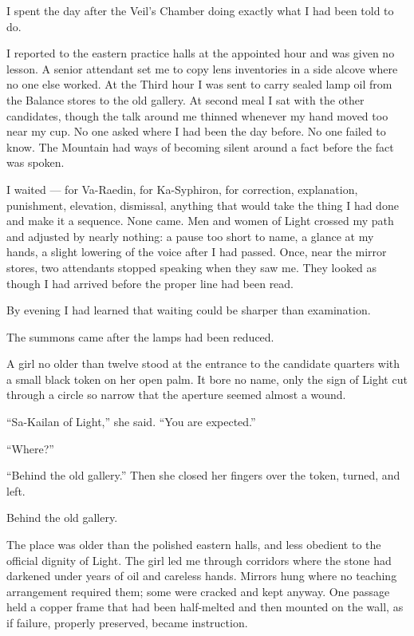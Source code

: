 \ornament

I spent the day after the Veil's Chamber doing exactly what I had been told to do.\par

I reported to the eastern practice halls at the appointed hour and was given no lesson. A senior attendant set me to copy lens inventories in a side alcove where no one else worked. At the Third hour I was sent to carry sealed lamp oil from the Balance stores to the old gallery. At second meal I sat with the other candidates, though the talk around me thinned whenever my hand moved too near my cup. No one asked where I had been the day before. No one failed to know. The Mountain had ways of becoming silent around a fact before the fact was spoken.\par

I waited --- for Va-Raedin, for Ka-Syphiron, for correction, explanation, punishment, elevation, dismissal, anything that would take the thing I had done and make it a sequence. None came. Men and women of Light crossed my path and adjusted by nearly nothing: a pause too short to name, a glance at my hands, a slight lowering of the voice after I had passed. Once, near the mirror stores, two attendants stopped speaking when they saw me. They looked as though I had arrived before the proper line had been read.\par

By evening I had learned that waiting could be sharper than examination.\par

The summons came after the lamps had been reduced.\par

A girl no older than twelve stood at the entrance to the candidate quarters with a small black token on her open palm. It bore no name, only the sign of Light cut through a circle so narrow that the aperture seemed almost a wound.\par

``Sa-Kailan of Light,'' she said. ``You are expected.''\par

``Where?''\par

``Behind the old gallery.'' Then she closed her fingers over the token, turned, and left.\par

Behind the old gallery.\par

The place was older than the polished eastern halls, and less obedient to the official dignity of Light. The girl led me through corridors where the stone had darkened under years of oil and careless hands. Mirrors hung where no teaching arrangement required them; some were cracked and kept anyway. One passage held a copper frame that had been half-melted and then mounted on the wall, as if failure, properly preserved, became instruction.\par

